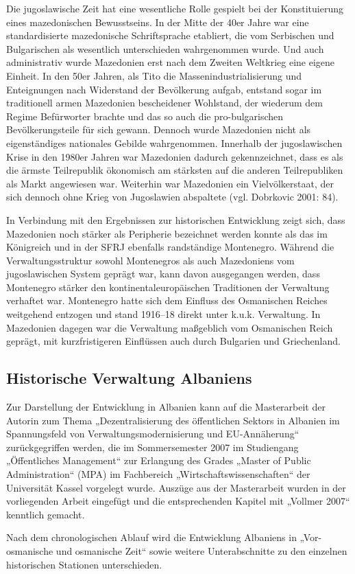 Die jugoslawische Zeit hat eine wesentliche Rolle gespielt bei der Konstituierung eines mazedonischen Bewusstseins. In der Mitte der 40er Jahre war eine standardisierte mazedonische Schriftsprache etabliert, die vom Serbischen und Bulgarischen als wesentlich unterschieden wahrgenommen wurde. Und auch administrativ wurde Mazedonien erst nach dem Zweiten Weltkrieg eine eigene Einheit. In den 50er Jahren, als Tito die Massenindustrialisierung und Enteignungen nach Widerstand der Bevölkerung aufgab, entstand sogar im traditionell armen Mazedonien bescheidener Wohlstand, der wiederum dem Regime Befürworter brachte und das so auch die pro-bulgarischen Bevölkerungsteile für sich gewann. Dennoch wurde Mazedonien nicht als eigenständiges nationales Gebilde wahrgenommen. Innerhalb der jugoslawischen Krise in den 1980er Jahren war Mazedonien dadurch gekennzeichnet, dass es als die ärmste Teilrepublik ökonomisch am stärksten auf die anderen Teilrepubliken als Markt angewiesen war. Weiterhin war Mazedonien ein Vielvölkerstaat, der sich dennoch ohne Krieg von Jugoslawien abspaltete (vgl. Dobrkovic 2001: 84).\par
In Verbindung mit den Ergebnissen zur historischen Entwicklung zeigt sich, dass Mazedonien noch stärker als Peripherie bezeichnet werden konnte als das im Königreich und in der SFRJ ebenfalls randständige Montenegro. Während die Verwaltungsstruktur sowohl Montenegros als auch Mazedoniens vom jugoslawischen System geprägt war, kann davon ausgegangen werden, dass Montenegro stärker den kontinentaleuropäischen Traditionen der Verwaltung verhaftet war. Montenegro hatte sich dem Einfluss des Osmanischen Reiches weitgehend entzogen und stand 1916–18 direkt unter k.u.k. Verwaltung. In Mazedonien dagegen war die Verwaltung maßgeblich vom Osmanischen Reich geprägt, mit kurzfristigeren Einflüssen auch durch Bulgarien und Griechenland.
\subsection{Historische Verwaltung Albaniens }
Zur Darstellung der Entwicklung in Albanien kann auf die Masterarbeit der Autorin zum Thema „Dezentralisierung des öffentlichen Sektors in Albanien im Spannungsfeld von Verwaltungsmodernisierung und EU-Annäherung“ zurückgegriffen werden, die im Sommersemester 2007 im Studiengang „Öffentliches Management“ zur Erlangung des Grades „Master of Public Administration“ (MPA) im Fachbereich „Wirtschaftswissenschaften“ der Universität Kassel vorgelegt wurde. Auszüge aus der Masterarbeit wurden in der vorliegenden Arbeit eingefügt und die entsprechenden Kapitel mit „Vollmer 2007“ kenntlich gemacht.\par
Nach dem chronologischen Ablauf wird die Entwicklung Albaniens in „Vor-osmanische und osmanische Zeit“ sowie weitere Unterabschnitte zu den einzelnen historischen Stationen unterschieden.
